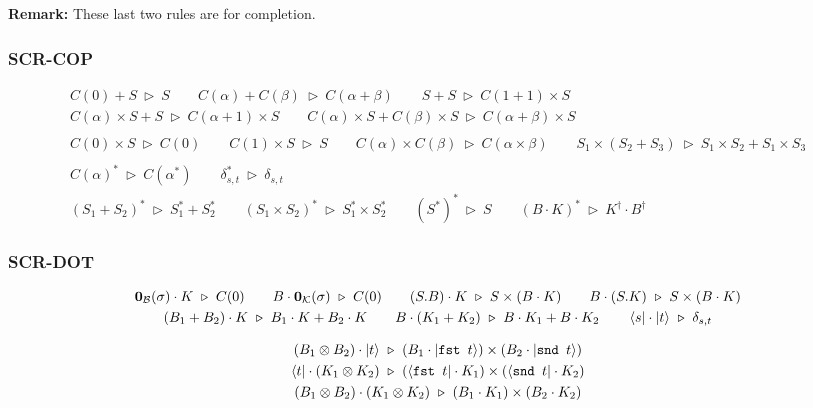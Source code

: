 \documentclass[manuscript, review, timestamp]{acmart}
\newcommand*{\fst}{\texttt{fst }}
\newcommand*{\snd}{\texttt{snd }}
\newcommand*{\reduce}{\ \triangleright\ }
\begin{document}
\textbf{Remark:} These last two rules are for completion.


\subsubsection*{\textsf{SCR-COP}}
\begin{gather*}
   C(0) + S \reduce S
  \qquad
   C(\alpha) + C(\beta) \reduce C(\alpha + \beta)
  \qquad
   S + S \reduce C(1 + 1) \times S \\
   C(\alpha) \times S + S \reduce C(\alpha + 1) \times S
  \qquad
   C(\alpha) \times S + C(\beta) \times S \reduce C(\alpha + \beta) \times S
  \\
  \\
   C(0) \times S \reduce C(0)
  \qquad
   C(1) \times S \reduce S
  \qquad
   C(\alpha) \times C(\beta) \reduce C(\alpha \times \beta)
  \qquad
   S_1 \times (S_2 + S_3) \reduce S_1 \times S_2 + S_1 \times S_3
  \\
  \\
   C(\alpha)^* \reduce C(\alpha^*)
  \qquad
   \delta_{s, t}^* \reduce \delta_{s, t} \\
   (S_1 + S_2)^* \reduce S_1^* + S_2^*
  \qquad
   (S_1 \times S_2)^* \reduce S_1^* \times S_2^*
  \qquad
   (S^*)^* \reduce S
  \qquad
   (B \cdot K)^* \reduce K^\dagger \cdot B^\dagger
\end{gather*}



\subsubsection*{\textsf{SCR-DOT}}
\begin{gather*}
  \mathbf{0}_\mathcal{B}(\sigma) \cdot K \reduce C(0)
  \qquad
  B \cdot \mathbf{0}_\mathcal{K}(\sigma) \reduce C(0)
  \qquad
  (S.B) \cdot K \reduce S \times (B \cdot K)
  \qquad
  B \cdot (S.K) \reduce S \times (B \cdot K) \\
  (B_1 + B_2) \cdot K \reduce B_1 \cdot K + B_2 \cdot K
  \qquad
  B \cdot (K_1 + K_2) \reduce B \cdot K_1 + B \cdot K_2
  \qquad
  \bra{s} \cdot \ket{t} \reduce \delta_{s, t} \\
\end{gather*}

\begin{gather*}
  (B_1 \otimes B_2) \cdot \ket{t} \reduce (B_1 \cdot \ket{\fst t}) \times (B_2 \cdot \ket{\snd t}) \\
  \bra{t} \cdot (K_1 \otimes K_2) \reduce (\bra{\fst t} \cdot K_1) \times (\bra{\snd t} \cdot K_2) \\
  (B_1 \otimes B_2) \cdot (K_1 \otimes K_2) \reduce (B_1 \cdot K_1) \times (B_2 \cdot K_2)
\end{gather*}
\end{document}
